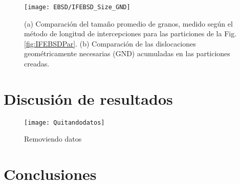 \begin{figure}[!htb]
  \centering
  \texttt{[image: EBSD/IFEBSD\_Size\_GND]}
  \caption{(a) Comparación del tamaño promedio de granos, medido según el método de longitud de intercepciones para las particiones de la Fig. \ref{fig:IFEBSDPar}. (b) Comparación de las dislocaciones geométricamente necesarias (GND) acumuladas en las particiones creadas.}
  \label{fig:IFEBSDVs}
\end{figure}

\newpage
\section{Discusión de resultados}\label{S:IFDis}

\begin{figure}[!htb]
  \centering
  \texttt{[image: Quitandodatos]}
  \caption{Removiendo datos}
  \label{fig:IFFWHMRecvsCrop}
\end{figure}

\newpage
\section{Conclusiones}\label{S:IFConclusiones}
